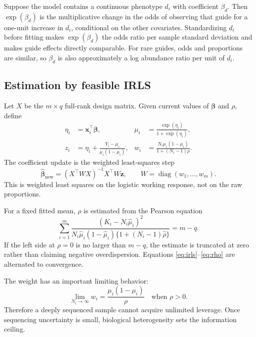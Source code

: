Suppose the model contains a continuous phenotype $d_i$ with coefficient
$\beta_d$.  Then $\exp(\beta_d)$ is the multiplicative change in the odds of
observing that guide for a one-unit increase in $d_i$, conditional on the other
covariates.  Standardizing $d_i$ before fitting makes $\exp(\beta_d)$ the odds
ratio per sample standard deviation and makes guide effects directly
comparable.  For rare guides, odds and proportions are similar, so $\beta_d$ is
also approximately a log abundance ratio per unit of $d_i$.

\subsection{Estimation by feasible IRLS}

Let $X$ be the $m\times q$ full-rank design matrix.  Given current values of
$\boldsymbol{\beta}$ and $\rho$, define
\begin{align}
  \eta_i &= \mathbf{x}_i^\top\boldsymbol{\beta}, &
  \mu_i &= \frac{\exp(\eta_i)}{1+\exp(\eta_i)},\\
  z_i &= \eta_i+\frac{Y_i-\mu_i}{\mu_i(1-\mu_i)}, &
  w_i &= \frac{N_i\mu_i(1-\mu_i)}
  {1+(N_i-1)\rho}. \label{eq:irls}
\end{align}
The coefficient update is the weighted least-squares step
\begin{equation}
  \widehat{\boldsymbol{\beta}}_{\mathrm{new}}
  =(X^\top W X)^{-1}X^\top W\mathbf{z},
  \qquad W=\operatorname{diag}(w_1,\ldots,w_m).
  \label{eq:betaupdate}
\end{equation}
This is weighted least squares on the logistic working response, not on the raw
proportions.

For a fixed fitted mean, $\rho$ is estimated from the Pearson equation
\begin{equation}
  \sum_{i=1}^{m}
  \frac{(K_i-N_i\widehat{\mu}_i)^2}
  {N_i\widehat{\mu}_i(1-\widehat{\mu}_i)
  \{1+(N_i-1)\widehat{\rho}\}}
  =m-q. \label{eq:rho}
\end{equation}
If the left side at $\rho=0$ is no larger than $m-q$, the estimate is truncated
at zero rather than claiming negative overdispersion.  Equations
\eqref{eq:irls}--\eqref{eq:rho} are alternated to convergence.

The weight has an important limiting behavior:
\begin{equation}
  \lim_{N_i\rightarrow\infty} w_i
  = \frac{\mu_i(1-\mu_i)}{\rho}
  \quad\text{when }\rho>0.
\end{equation}
Therefore a deeply sequenced sample cannot acquire unlimited leverage.  Once
sequencing uncertainty is small, biological heterogeneity sets the information
ceiling.

